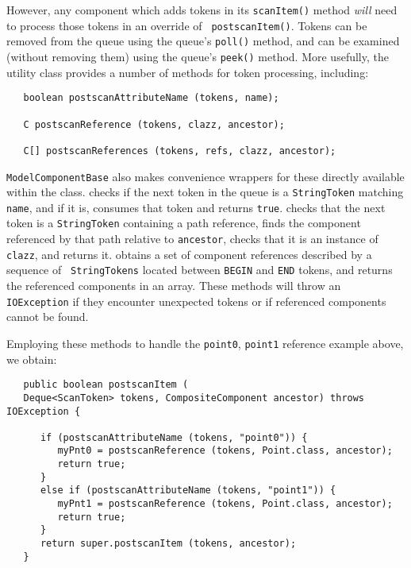 \documentclass{article}
\begin{document}
However, any component which adds tokens in its {\tt scanItem()}
method {\it will} need to process those tokens in an override of {\tt
postscanItem()}. Tokens can be removed from the queue using
the queue's {\tt poll()} method, and can be examined (without removing
them) using the queue's {\tt peek()} method. More usefully, 
the utility class 
 provides
a number of methods for token processing, including:
\begin{lstlisting}
   boolean postscanAttributeName (tokens, name);

   C postscanReference (tokens, clazz, ancestor);

   C[] postscanReferences (tokens, refs, clazz, ancestor);
\end{lstlisting}
{\tt ModelComponentBase} also makes convenience wrappers for these
directly available within the class.
checks if the next token in the queue is a {\tt StringToken} matching
{\tt name}, and if it is, consumes that token and returns {\tt true}.
checks that the next token is a {\tt StringToken} containing a path
reference, finds the component referenced by that path relative to
{\tt ancestor}, checks that it is an instance of {\tt clazz}, and
returns it.
obtains a set of component references described by a sequence of {\tt
StringTokens} located between {\tt BEGIN} and {\tt END} tokens, and
returns the referenced components in an array.  These methods will
throw an {\tt IOException} if they encounter unexpected tokens or if
referenced components cannot be found.

Employing these methods to handle the 
{\tt point0}, {\tt point1} reference example above, we obtain:
\begin{lstlisting}
   public boolean postscanItem (
   Deque<ScanToken> tokens, CompositeComponent ancestor) throws IOException {

      if (postscanAttributeName (tokens, "point0")) {
         myPnt0 = postscanReference (tokens, Point.class, ancestor);
         return true;
      }
      else if (postscanAttributeName (tokens, "point1")) {
         myPnt1 = postscanReference (tokens, Point.class, ancestor);
         return true;
      }
      return super.postscanItem (tokens, ancestor);
   }
\end{lstlisting}
\end{document}
